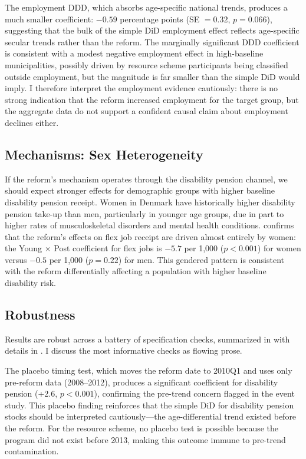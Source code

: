 \documentclass[12pt]{article}
\begin{document}
The employment DDD, which absorbs age-specific national trends, produces a much smaller coefficient: $-0.59$ percentage points (SE $= 0.32$, $p = 0.066$), suggesting that the bulk of the simple DiD employment effect reflects age-specific secular trends rather than the reform. The marginally significant DDD coefficient is consistent with a modest negative employment effect in high-baseline municipalities, possibly driven by resource scheme participants being classified outside employment, but the magnitude is far smaller than the simple DiD would imply. I therefore interpret the employment evidence cautiously: there is no strong indication that the reform increased employment for the target group, but the aggregate data do not support a confident causal claim about employment declines either.

\subsection{Mechanisms: Sex Heterogeneity}

If the reform's mechanism operates through the disability pension channel, we should expect stronger effects for demographic groups with higher baseline disability pension receipt. Women in Denmark have historically higher disability pension take-up than men, particularly in younger age groups, due in part to higher rates of musculoskeletal disorders and mental health conditions.  confirms that the reform's effects on flex job receipt are driven almost entirely by women: the Young $\times$ Post coefficient for flex jobs is $-5.7$ per 1,000 ($p < 0.001$) for women versus $-0.5$ per 1,000 ($p = 0.22$) for men. This gendered pattern is consistent with the reform differentially affecting a population with higher baseline disability risk.



\subsection{Robustness}

Results are robust across a battery of specification checks, summarized in  with details in . I discuss the most informative checks as flowing prose.



The placebo timing test, which moves the reform date to 2010Q1 and uses only pre-reform data (2008--2012), produces a significant coefficient for disability pension (+2.6, $p < 0.001$), confirming the pre-trend concern flagged in the event study. This placebo finding reinforces that the simple DiD for disability pension stocks should be interpreted cautiously---the age-differential trend existed before the reform. For the resource scheme, no placebo test is possible because the program did not exist before 2013, making this outcome immune to pre-trend contamination.
\end{document}
